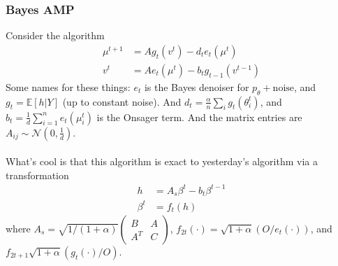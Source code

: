 \subsubsection{Bayes AMP}
Consider the algorithm
\begin{align}
	\mu^{t+1} &= A g_t(v^t) - d_t e_t(\mu^t)\\
	v^t & = A e_t(\mu^t) - b_t g_{t-1}(v^{t-1})
\end{align}
Some names for these things: $e_t$ is the Bayes denoiser for $p_\theta + \text{noise}$, and $g_t = \mathbb E[h |Y]$ (up to constant noise). And $d_t = \frac{\alpha}{n} \sum_i g_t(\theta_i^t)$, and $b_t = \frac{1}{d} \sum_{i=1}^n e_t(\mu^t_i)$ is the Onsager term. And the matrix entries are $A_{ij} \sim \mathcal N(0, \frac{1}{d})$.\\
\\
What's cool is that this algorithm is exact to yesterday's algorithm via a transformation
\begin{align}
	h & = A_s \beta^t - b_t \beta^{t-1}\\
	\beta^t & = f_t(h)
\end{align}
where $A_s = \sqrt{1/(1+\alpha)} \begin{pmatrix}
	B  &A \\ A^T & C
\end{pmatrix}$, $f_{2t}(\cdot) = \sqrt{1+\alpha} (O / e_t(\cdot))$, and $f_{2t+1} \sqrt{1+\alpha} \left( g_t(\cdot) / O \right)$.  




























